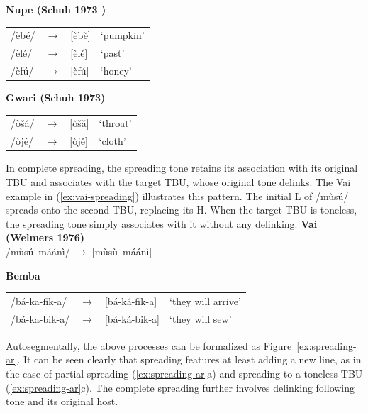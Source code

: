 \ex \textbf{Nupe (Schuh 1973 )} \label{ex:nupe-spreading}\\
\begin{tabular}{@{}lcll@{}}
	/èbé/ & $\rightarrow$ & [èbě] & `pumpkin' \\
	/èlé/ & $\rightarrow$ & [èlě] & `past' \\
	/èfú/ & $\rightarrow$ & [èfú] & `honey'
\end{tabular}
\xe

\ex \textbf{Gwari (Schuh 1973)} \label{ex:gwari-spreading}\\
\begin{tabular}{@{}lcll@{}}
	/òšá/ & $\rightarrow$ & [òšǎ] & `throat' \\
	/òjé/ & $\rightarrow$ & [òjě] & `cloth'
\end{tabular}
\xe

In complete spreading, the spreading tone retains its association
with its original TBU and associates with the target TBU, whose
original tone delinks. The Vai example in (\ref{ex:vai-spreading})
illustrates this pattern. The initial L of /mùsú/ spreads onto the
second TBU, replacing its H. When the target TBU is toneless, the
spreading tone simply associates with it without any delinking.
\ex \textbf{Vai (Welmers 1976)} \label{ex:vai-spreading}\\
/mùsú\ máánì/ $\rightarrow$ [mùsù\ máánì]
\xe

\ex \textbf{Bemba} \label{ex:bemba-spreading}\\
\begin{tabular}{@{}lcll@{}}
	/bá-ka-fik-a/ & $\rightarrow$ & [bá-ká-fik-a] & `they will arrive' \\
	/bá-ka-bik-a/ & $\rightarrow$ & [bá-ká-bik-a] & `they will sew'
\end{tabular}
\xe

Autosegmentally, the above processes can be formalized as Figure~\ref{ex:spreading-ar}. It can be seen clearly that spreading
features at least adding a new line, as in the case of partial spreading
(\ref{ex:spreading-ar}a) and spreading to a toneless TBU (\ref{ex:spreading-ar}c). The complete spreading further involves 
delinking following tone and its original host. 

